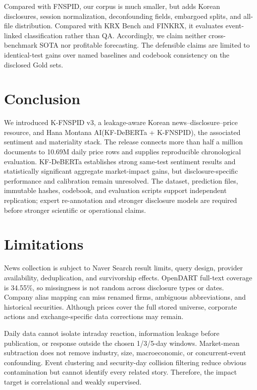 \documentclass[11pt]{article}
\newcommand{\dataset}{K-FNSPID v3}
\newcommand{\system}{Hana Montana AI(KF-DeBERTa + K-FNSPID)}
\begin{document}
Compared with FNSPID, our corpus is much smaller, but adds Korean disclosures, session normalization, deconfounding fields, embargoed splits, and all-file distribution. Compared with KRX Bench and FINKRX, it evaluates event-linked classification rather than QA. Accordingly, we claim neither cross-benchmark SOTA nor profitable forecasting. The defensible claims are limited to identical-test gains over named baselines and codebook consistency on the disclosed Gold sets.

\section{Conclusion}

We introduced \dataset, a leakage-aware Korean news--disclosure--price resource, and \system, the associated sentiment and materiality stack. The release connects more than half a million documents to 10.69M daily price rows and supplies reproducible chronological evaluation. KF-DeBERTa establishes strong same-test sentiment results and statistically significant aggregate market-impact gains, but disclosure-specific performance and calibration remain unresolved. The dataset, prediction files, immutable hashes, codebook, and evaluation scripts support independent replication; expert re-annotation and stronger disclosure models are required before stronger scientific or operational claims.

\clearpage
\section*{Limitations}

News collection is subject to Naver Search result limits, query design, provider availability, deduplication, and survivorship effects. OpenDART full-text coverage is 34.55\%, so missingness is not random across disclosure types or dates. Company alias mapping can miss renamed firms, ambiguous abbreviations, and historical securities. Although prices cover the full stored universe, corporate actions and exchange-specific data corrections may remain.

Daily data cannot isolate intraday reaction, information leakage before publication, or response outside the chosen 1/3/5-day windows. Market-mean subtraction does not remove industry, size, macroeconomic, or concurrent-event confounding. Event clustering and security-day collision filtering reduce obvious contamination but cannot identify every related story. Therefore, the impact target is correlational and weakly supervised.
\end{document}

